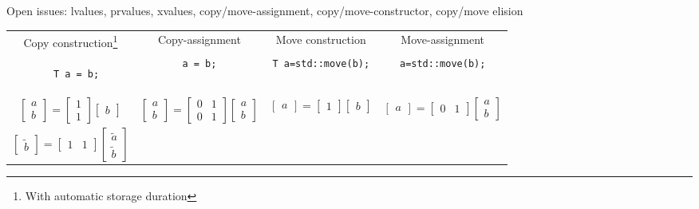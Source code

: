 \documentclass[9pt]{beamer}
\begin{document}
\begin{frame}[fragile]{Open issues: lvalues, prvalues, xvalues, copy/move-assignment, copy/move-constructor, copy/move elision}

  \begin{tabular}{c|c|c|c}
  Copy construction\footnote{With automatic storage duration}                      &     Copy-assignment    & Move construction & Move-assignment \\
  \begin{lstlisting}
  T a = b;

  \end{lstlisting}
    &  \lstinline|a = b;|    &   \lstinline|T a=std::move(b);|   & \lstinline|a=std::move(b);|   \\ \hline
    $\begin{bmatrix} a \\ b \end{bmatrix} = \begin{bmatrix} 1 \\ 1 \end{bmatrix} \begin{bmatrix} b \end{bmatrix}$   &
    $\begin{bmatrix} a \\ b \end{bmatrix} = \begin{bmatrix} 0 & 1 \\ 0 & 1 \end{bmatrix} \begin{bmatrix} a \\ b \end{bmatrix}$ &
    $\begin{bmatrix} a \end{bmatrix} = \begin{bmatrix} 1 \end{bmatrix} \begin{bmatrix} b \end{bmatrix}$  &
    $\begin{bmatrix} a \end{bmatrix} = \begin{bmatrix} 0  & 1 \end{bmatrix} \begin{bmatrix} a \\ b \end{bmatrix}$  \\

    \rule{0pt}{6ex}    $\begin{bmatrix} \tilde{b} \end{bmatrix} = \begin{bmatrix} 1 & 1 \end{bmatrix} \begin{bmatrix} \tilde{a} \\ \tilde{b} \end{bmatrix}$   &


\end{tabular}
\end{frame}
\end{document}
